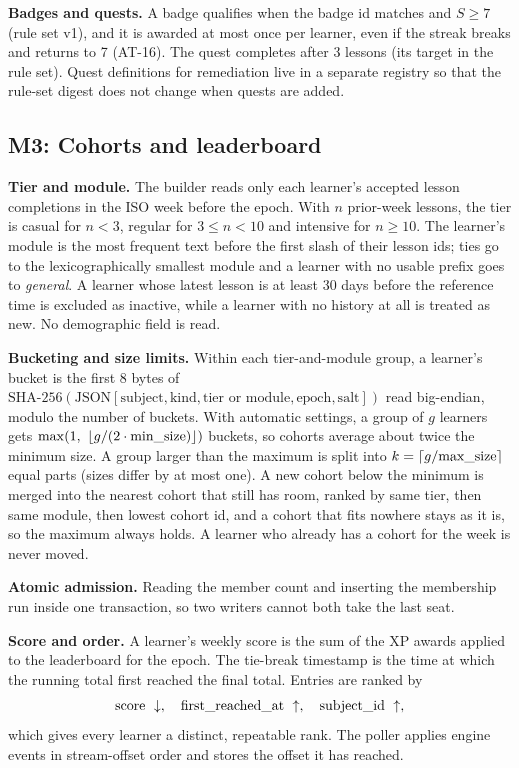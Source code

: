 \documentclass[11pt,a4paper]{article}
\renewcommand{\_}{\textunderscore\allowbreak{}}
\begin{document}
\textbf{Badges and quests.} A badge qualifies when the badge id matches and $S \ge 7$ (rule set v1), and it is awarded at most once per learner, even if the streak breaks and returns to 7 (AT-16). The quest  completes after 3 lessons (its target in the rule set). Quest definitions for remediation live in a separate registry so that the rule-set digest does not change when quests are added.

\subsection{M3: Cohorts and leaderboard}

\textbf{Tier and module.} The builder reads only each learner's accepted lesson completions in the ISO week before the epoch. With $n$ prior-week lessons, the tier is casual for $n<3$, regular for $3 \le n < 10$ and intensive for $n \ge 10$. The learner's module is the most frequent text before the first slash of their lesson ids; ties go to the lexicographically smallest module and a learner with no usable prefix goes to \emph{general}. A learner whose latest lesson is at least 30 days before the reference time is excluded as inactive, while a learner with no history at all is treated as new. No demographic field is read.

\textbf{Bucketing and size limits.} Within each tier-and-module group, a learner's bucket is the first 8 bytes of $\text{SHA-256}(\text{JSON}[\text{subject}, \text{kind}, \text{tier or module}, \text{epoch}, \text{salt}])$ read big-endian, modulo the number of buckets. With automatic settings, a group of $g$ learners gets $\max(1,\ \lfloor g/(2\cdot \text{min\_size})\rfloor)$ buckets, so cohorts average about twice the minimum size. A group larger than the maximum is split into $k=\lceil g/\text{max\_size}\rceil$ equal parts (sizes differ by at most one). A new cohort below the minimum is merged into the nearest cohort that still has room, ranked by same tier, then same module, then lowest cohort id, and a cohort that fits nowhere stays as it is, so the maximum always holds. A learner who already has a cohort for the week is never moved.

\textbf{Atomic admission.} Reading the member count and inserting the membership run inside one  transaction, so two writers cannot both take the last seat.

\textbf{Score and order.} A learner's weekly score is the sum of the XP awards applied to the leaderboard for the epoch. The tie-break timestamp  is the time at which the running total first reached the final total. Entries are ranked by
\[
\text{score}\ \downarrow,\quad \text{first\_reached\_at}\ \uparrow,\quad \text{subject\_id}\ \uparrow,
\]
which gives every learner a distinct, repeatable rank. The poller applies engine events in stream-offset order and stores the offset it has reached.
\end{document}
